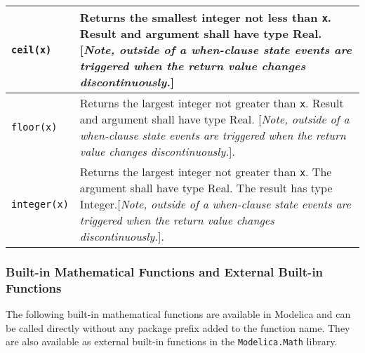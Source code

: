 \begin{longtable}{|p{2cm}|p{12cm}|}
\lstinline[basicstyle=\ttfamily]!ceil(x)! & Returns the smallest integer not less than \lstinline[basicstyle=\ttfamily]!x!. Result and
argument shall have type Real. {[}\emph{Note, outside of a when-clause
state events are triggered when the return value changes
discontinuously.}{]}\\ \hline
\lstinline[basicstyle=\ttfamily]!floor(x)! & Returns the largest integer not greater than \lstinline[basicstyle=\ttfamily]!x!. Result and
argument shall have type Real. {[}\emph{Note, outside of a when-clause
state events are triggered when the return value changes
discontinuously.}{]}.\\ \hline
\lstinline[basicstyle=\ttfamily]!integer(x)! & Returns the largest integer not greater
than \lstinline[basicstyle=\ttfamily]!x!. The argument shall have type Real. The result has type
Integer.{[}\emph{Note, outside of a when-clause state
events are triggered when the return value changes
discontinuously.}{]}.\\ \hline
\end{longtable}

\subsubsection{Built-in Mathematical Functions and External Built-in Functions}

The following built-in mathematical functions are available in Modelica
and can be called directly without any package prefix added to the
function name. They are also available as external built-in functions in
the \lstinline[basicstyle=\ttfamily]!Modelica.Math! library.

